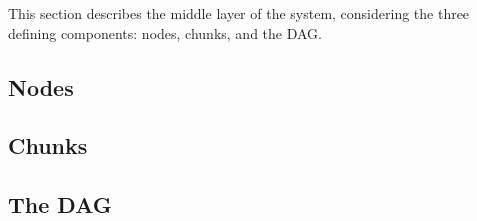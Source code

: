 This section describes the middle layer of the system, considering the three defining components: nodes, chunks, and the DAG.

\subsection{Nodes}

\subsection{Chunks}

\subsection{The DAG}

